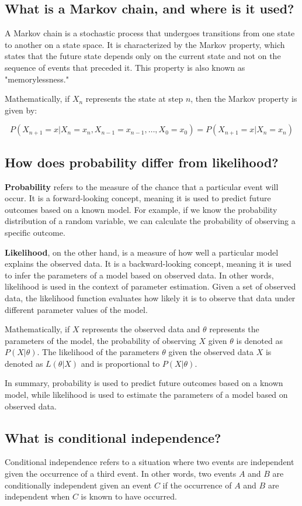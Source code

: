 \documentclass[12pt]{article}
\begin{document}
\subsection{What is a Markov chain, and where is it used?}
A Markov chain is a stochastic process that undergoes transitions from one state to another on a state space. It is characterized by the Markov property, which states that the future state depends only on the current state and not on the sequence of events that preceded it. This property is also known as "memorylessness."

Mathematically, if \(X_n\) represents the state at step \(n\), then the Markov property is given by:

\[ P(X_{n+1} = x | X_n = x_n, X_{n-1} = x_{n-1}, \ldots, X_0 = x_0) = P(X_{n+1} = x | X_n = x_n) \]

\subsection{How does probability differ from likelihood?}
\textbf{Probability} refers to the measure of the chance that a particular event will occur. It is a forward-looking concept, meaning it is used to predict future outcomes based on a known model. For example, if we know the probability distribution of a random variable, we can calculate the probability of observing a specific outcome.

\textbf{Likelihood}, on the other hand, is a measure of how well a particular model explains the observed data. It is a backward-looking concept, meaning it is used to infer the parameters of a model based on observed data. In other words, likelihood is used in the context of parameter estimation. Given a set of observed data, the likelihood function evaluates how likely it is to observe that data under different parameter values of the model.

Mathematically, if \(X\) represents the observed data and \(\theta\) represents the parameters of the model, the probability of observing \(X\) given \(\theta\) is denoted as \(P(X|\theta)\). The likelihood of the parameters \(\theta\) given the observed data \(X\) is denoted as \(L(\theta|X)\) and is proportional to \(P(X|\theta)\).

In summary, probability is used to predict future outcomes based on a known model, while likelihood is used to estimate the parameters of a model based on observed data.

\subsection{What is conditional independence?}
Conditional independence refers to a situation where two events are independent given the occurrence of a third event. In other words, two events \(A\) and \(B\) are conditionally independent given an event \(C\) if the occurrence of \(A\) and \(B\) are independent when \(C\) is known to have occurred.
\end{document}
